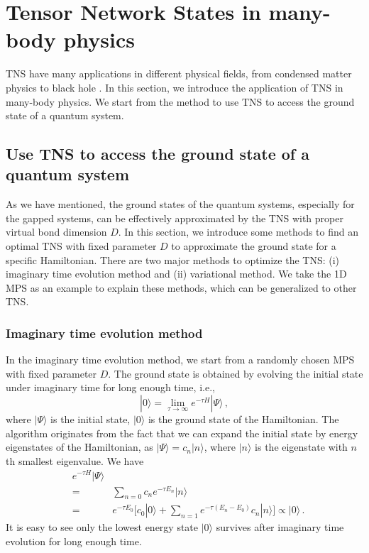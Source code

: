\documentclass[preprint,3p,times,preprint,showpacs,amsmath,superscriptaddress,floatfix]{elsarticle}
\newcounter{bla}
\begin{document}
\section{Tensor Network States in many-body physics}
\label{sec:theory2}

TNS have many applications in different physical fields, from condensed matter physics to black hole \cite{Pastawski15}. In this section, we introduce the application of TNS in many-body physics. We start from the method to use TNS to access the ground state of a quantum system.

\subsection{Use TNS to access the ground state of a quantum system}

As we have mentioned, the ground states of the quantum systems, especially for the gapped systems, can be effectively approximated by the TNS with proper virtual
bond dimension $D$. In this section, we introduce some methods to find an optimal TNS with fixed parameter $D$ to approximate the ground state for
a specific Hamiltonian. There are two major methods to optimize the TNS: (i) imaginary time evolution method and (ii) variational method.
We take the 1D MPS as an example to explain these methods, which can be generalized to other TNS.
	
\subsubsection{Imaginary time evolution method}

In the imaginary time evolution method, we start from a randomly chosen MPS  with fixed parameter $D$.
The ground state is obtained by evolving the initial state under imaginary time for long enough time, i.e.,
%
\begin{equation}\label{TEBDformula1}
	|0\rangle=\lim_{\tau\rightarrow\infty}e^{-\tau H}|\Psi\rangle \, ,
\end{equation}
%
where $|\Psi\rangle$ is the initial state, $|0\rangle$ is the ground state of the Hamiltonian. The algorithm originates from the fact that we can expand the initial state by energy eigenstates of the Hamiltonian, as $|\Psi\rangle=c_n|n\rangle$, where $|n\rangle$ is the eigenstate with $n$th smallest eigenvalue.
We have
%
\begin{eqnarray}\label{TEBDformula}
&e^{-\tau H}|\Psi\rangle\\ \nonumber
&=&\sum_{n=0} c_n e^{-\tau E_n}|n\rangle \\ \nonumber
&=&e^{-\tau E_0}\Big[c_0|0\rangle+\sum_{n=1}e^{-\tau (E_n-E_0)}c_n|n\rangle\Big] \propto |0\rangle \, .
\end{eqnarray}
%
It is easy to see only the lowest energy state $|0\rangle$ survives after imaginary time evolution for long enough time.
\end{document}
